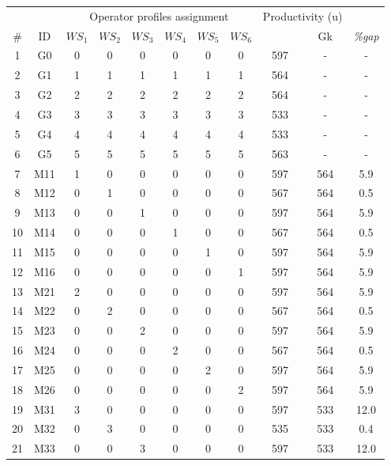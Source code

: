 \documentclass[review,12pt, 3p, times]{elsarticle}
\begin{document}
\setcounter{table}{0}
\begin{table}[htbp]
    \begin{center}
        \begin{longtable}{|cc|cccccc|ccc|}
	    \hline
	    \multicolumn{2}{|c|}{} & \multicolumn{6}{c|}{Operator profiles assignment}& \multicolumn{2}{c}{Productivity (u)}&\\
            \# & ID  & $\textit{WS}_1$ & $\textit{WS}_2$ & $\textit{WS}_3$ & $\textit{WS}_4$ & $\textit{WS}_5$ & $\textit{WS}_6$ & 
			& Gk   & \it{\%gap} \\ 
			\hline
			1  & G0  & 0 & 0 & 0 & 0 & 0 & 0 & 597 & -   & -    \\
			2  & G1  & 1 & 1 & 1 & 1 & 1 & 1 & 564 & -   & -    \\
			3  & G2  & 2 & 2 & 2 & 2 & 2 & 2 & 564 & -   & -    \\
			4  & G3  & 3 & 3 & 3 & 3 & 3 & 3 & 533 & -   & -    \\
			5  & G4  & 4 & 4 & 4 & 4 & 4 & 4 & 533 & -   & -    \\
			6  & G5  & 5 & 5 & 5 & 5 & 5 & 5 & 563 & -   & -    \\
			\hline
			7  & M11 & 1 & 0 & 0 & 0 & 0 & 0 & 597 & 564 & 5.9  \\
			8  & M12 & 0 & 1 & 0 & 0 & 0 & 0 & 567 & 564 & 0.5  \\
			9  & M13 & 0 & 0 & 1 & 0 & 0 & 0 & 597 & 564 & 5.9  \\
			10 & M14 & 0 & 0 & 0 & 1 & 0 & 0 & 567 & 564 & 0.5  \\
			11 & M15 & 0 & 0 & 0 & 0 & 1 & 0 & 597 & 564 & 5.9  \\
			12 & M16 & 0 & 0 & 0 & 0 & 0 & 1 & 597 & 564 & 5.9  \\
			\hline
			13 & M21 & 2 & 0 & 0 & 0 & 0 & 0 & 597 & 564 & 5.9  \\
			14 & M22 & 0 & 2 & 0 & 0 & 0 & 0 & 567 & 564 & 0.5  \\
			15 & M23 & 0 & 0 & 2 & 0 & 0 & 0 & 597 & 564 & 5.9  \\
			16 & M24 & 0 & 0 & 0 & 2 & 0 & 0 & 567 & 564 & 0.5  \\
			17 & M25 & 0 & 0 & 0 & 0 & 2 & 0 & 597 & 564 & 5.9  \\
			18 & M26 & 0 & 0 & 0 & 0 & 0 & 2 & 597 & 564 & 5.9  \\
			\hline
			19 & M31 & 3 & 0 & 0 & 0 & 0 & 0 & 597 & 533 & 12.0 \\
			20 & M32 & 0 & 3 & 0 & 0 & 0 & 0 & 535 & 533 & 0.4  \\
			21 & M33 & 0 & 0 & 3 & 0 & 0 & 0 & 597 & 533 & 12.0 \\

\end{longtable}
\end{center}
\end{table}
\end{document}
